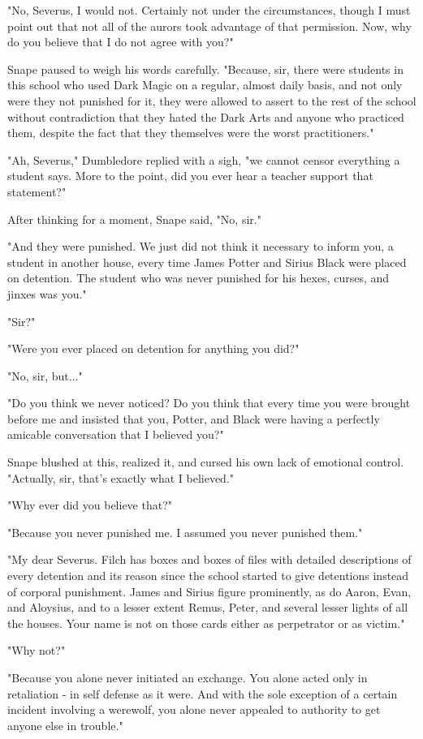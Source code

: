 \documentclass[a4paper,11pt]{article}
\begin{document}
"No, Severus, I would not. Certainly not under the circumstances, though I must point out that not all of the aurors took advantage of that permission. Now, why do you believe that I do not agree with you?"

Snape paused to weigh his words carefully. "Because, sir, there were students in this school who used Dark Magic on a regular, almost daily basis, and not only were they not punished for it, they were allowed to assert to the rest of the school without contradiction that they hated the Dark Arts and anyone who practiced them, despite the fact that they themselves were the worst practitioners."

"Ah, Severus," Dumbledore replied with a sigh, "we cannot censor everything a student says. More to the point, did you ever hear a teacher support that statement?"

After thinking for a moment, Snape said, "No, sir."

"And they were punished. We just did not think it necessary to inform you, a student in another house, every time James Potter and Sirius Black were placed on detention. The student who was never punished for his hexes, curses, and jinxes was you."

"Sir?"

"Were you ever placed on detention for anything you did?"

"No, sir, but..."

"Do you think we never noticed? Do you think that every time you were brought before me and insisted that you, Potter, and Black were having a perfectly amicable conversation that I believed you?"

Snape blushed at this, realized it, and cursed his own lack of emotional control. "Actually, sir, that's exactly what I believed."

"Why ever did you believe that?"

"Because you never punished me. I assumed you never punished them."

"My dear Severus. Filch has boxes and boxes of files with detailed descriptions of every detention and its reason since the school started to give detentions instead of corporal punishment. James and Sirius figure prominently, as do Aaron, Evan, and Aloysius, and to a lesser extent Remus, Peter, and several lesser lights of all the houses. Your name is not on those cards either as perpetrator or as victim."

"Why not?"

"Because you alone never initiated an exchange. You alone acted only in retaliation - in self defense as it were. And with the sole exception of a certain incident involving a werewolf, you alone never appealed to authority to get anyone else in trouble."
\end{document}
